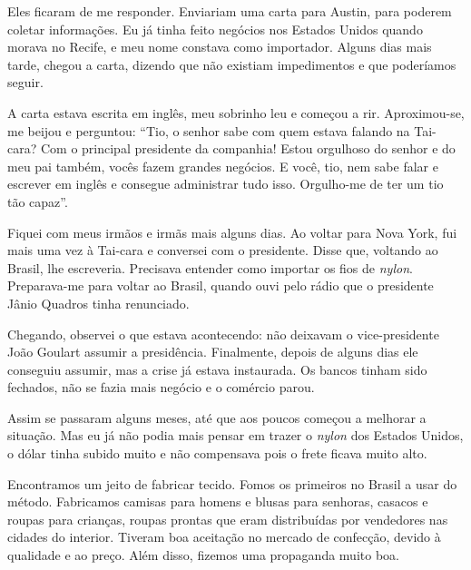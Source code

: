 Eles ficaram de me responder. Enviariam uma carta para Austin, para poderem 
coletar informações. Eu já tinha feito negócios nos Estados
Unidos quando morava no Recife, e meu nome constava como importador.
Alguns dias mais tarde, chegou a carta, dizendo que não
existiam impedimentos e que poderíamos seguir. 

A carta estava
escrita em inglês, meu sobrinho leu e começou a rir. Aproximou-se, me
beijou e perguntou: ``Tio, o senhor sabe com quem estava falando na Tai-cara? Com
o principal presidente da companhia! Estou orgulhoso do senhor e do
meu pai também, vocês fazem grandes negócios. E você, tio, nem sabe
falar e escrever em inglês e consegue administrar tudo isso. Orgulho-me
de ter um tio tão capaz''.

Fiquei com meus irmãos e irmãs mais alguns dias. Ao voltar para Nova York, 
fui mais uma vez à Tai-cara e conversei com o presidente. Disse que,  
voltando ao Brasil, lhe escreveria. Precisava entender como importar os fios de \textit{nylon}. Preparava-me para voltar ao Brasil, quando ouvi pelo rádio que o presidente Jânio
Quadros tinha renunciado.

Chegando, observei o que estava acontecendo: não
deixavam o vice-presidente João Goulart assumir a presidência. 
Finalmente, depois de alguns dias ele conseguiu assumir, mas a crise já estava instaurada. Os bancos tinham sido fechados, não se fazia mais negócio e o comércio parou.


Assim se passaram alguns meses, até que aos poucos começou a melhorar a
situação. Mas eu já não podia mais pensar em trazer o \textit{nylon} dos Estados
Unidos, o dólar tinha subido muito e não compensava pois o frete 
ficava muito alto.


Encontramos um jeito de fabricar tecido. Fomos os primeiros no Brasil a usar do método. Fabricamos camisas para homens e blusas para
senhoras, casacos e roupas para crianças, roupas prontas que eram
distribuídas por vendedores nas cidades do interior. Tiveram boa
aceitação no mercado de confecção, devido à qualidade e ao preço. Além
disso, fizemos uma propaganda muito boa.

